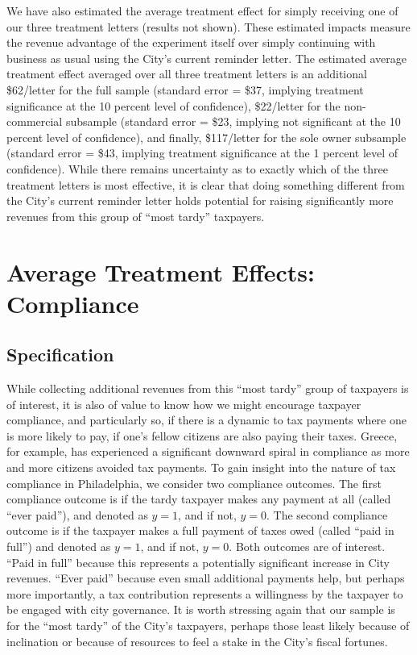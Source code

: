\documentclass[12pt,titlepage]{article}
\begin{document}
We have also estimated the average treatment effect for simply 
receiving one of our three treatment letters (results not shown).   
These estimated impacts measure the revenue advantage of the 
experiment itself over simply continuing with business as usual 
using the City’s current reminder letter.  The estimated average 
treatment effect averaged over all three treatment letters is an 
additional \$62/letter for the full sample (standard error = \$37, 
implying treatment significance at the 10 percent level of confidence), 
\$22/letter for the non-commercial subsample (standard error = \$23, 
implying not significant at the 10 percent level of confidence), 
and finally, \$117/letter for the sole owner subsample (standard 
error = \$43, implying treatment significance at the 1 percent 
level of confidence).  While there remains uncertainty as to 
exactly which of the three treatment letters is most effective, 
it is clear that doing something different from the City’s current 
reminder letter holds potential for raising significantly more 
revenues from this group of “most tardy” taxpayers.  

\section{Average Treatment Effects: Compliance}

\subsection{Specification}

While collecting additional revenues from this “most tardy” group 
of taxpayers is of interest, it is also of value to know how we 
might encourage taxpayer compliance, and particularly so, if 
there is a dynamic to tax payments where one is more likely to 
pay, if one’s fellow citizens are also paying their taxes.   
Greece, for example, has experienced a significant downward spiral 
in compliance as more and more citizens avoided tax payments.   
To gain insight into the nature of tax compliance in Philadelphia, 
we consider two compliance outcomes.   The first compliance outcome 
is if the tardy taxpayer makes any payment at all (called “ever paid”), 
and denoted as $y = 1$, and if not, $y = 0$.   The second compliance 
outcome is if the taxpayer makes a full payment of taxes owed (called 
“paid in full”) and denoted as $y = 1$, and if not, $y = 0$.  Both outcomes 
are of interest.  “Paid in full” because this represents a potentially 
significant increase in City revenues.   “Ever paid” because even small 
additional payments help, but perhaps more importantly, a tax 
contribution represents a willingness by the taxpayer to be engaged 
with city governance.  It is worth stressing again that our sample is 
for the “most tardy” of the City’s taxpayers, perhaps those least 
likely because of inclination or because of resources to feel a stake 
in the City’s fiscal fortunes.    
\end{document}

